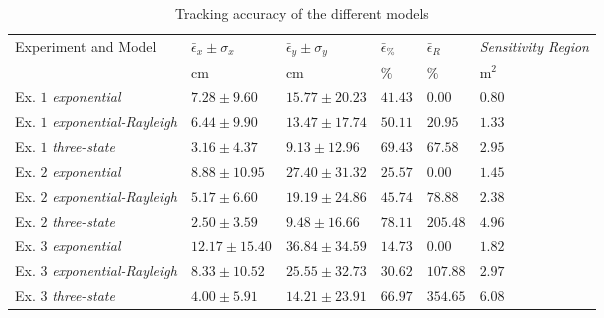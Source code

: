 \documentclass[journal, 10pt, twocolumn, balance]{IEEEtran}
\begin{document}
\begin{table*}[t]
    \caption{Tracking accuracy of the different models} \centering \renewcommand{\arraystretch}{1.2}\begin{tabular}{| l || >{\centering\arraybackslash}m{2.1cm} | >{\centering\arraybackslash}m{2.1cm} | 
	>{\centering\arraybackslash}m{1.1cm} | >{\centering\arraybackslash}m{1.1cm} |>{\centering\arraybackslash}m{2.1cm} |} \hline\hline
	\multirow{2}{*}{Experiment and Model} & $\bar{\epsilon}_x \pm \sigma_x$ & $\bar{\epsilon}_y \pm \sigma_y$ &
					        $\bar{\epsilon}_\%$ & $\bar{\epsilon}_R$ & \emph{Sensitivity Region} \\
	
	\cline{2-6}
	& cm & cm & $\%$ & $\%$ & m$^2$\\
	\hline
	Ex. $1$ \emph{exponential} & $7.28 \pm 9.60$ & $15.77 \pm 20.23$ & $41.43$ & $0.00$ & $0.80$\\
	Ex. $1$ \emph{exponential-Rayleigh} & $6.44 \pm 9.90$ & $13.47 \pm 17.74$ & $50.11$ & $20.95$ & $1.33$\\
	Ex. $1$ \emph{three-state} & $\bm{3.16} \pm \bm{4.37}$ & $\bm{9.13} \pm \bm{12.96}$ 
				   & $\bm{69.43}$ & $\bm{67.58}$ & $\bm{2.95}$\\
				
				 
	\hline			
	Ex. $2$ \emph{exponential} & $8.88 \pm 10.95$ & $27.40 \pm 31.32$ & $25.57$ & $0.00$ & $1.45$\\
	Ex. $2$ \emph{exponential-Rayleigh} & $5.17 \pm 6.60$ & $19.19 \pm 24.86$ & $45.74$ & $78.88$ & $2.38$\\
	Ex. $2$ \emph{three-state} & $\bm{2.50} \pm \bm{3.59}$ & $\bm{9.48} \pm \bm{16.66}$ 
				   & $\bm{78.11}$ & $\bm{205.48}$ & $\bm{4.96}$\\
				

	\hline			
	Ex. $3$ \emph{exponential} & $12.17 \pm 15.40$ & $36.84 \pm 34.59$ & $14.73$ & $0.00$ & $1.82$\\
	Ex. $3$ \emph{exponential-Rayleigh} & $8.33 \pm 10.52$ & $25.55 \pm 32.73$ & $30.62$ & $107.88$ & $2.97$\\
	Ex. $3$ \emph{three-state} & $\bm{4.00} \pm \bm{5.91}$ & $\bm{14.21} \pm \bm{23.91}$ 
				   & $\bm{66.97}$ & $\bm{354.65}$ & $\bm{6.08}$\\
					
					
	\hline
        \end{tabular}
        \label{table:tracking_accuracy} \end{table*}
\end{document}
